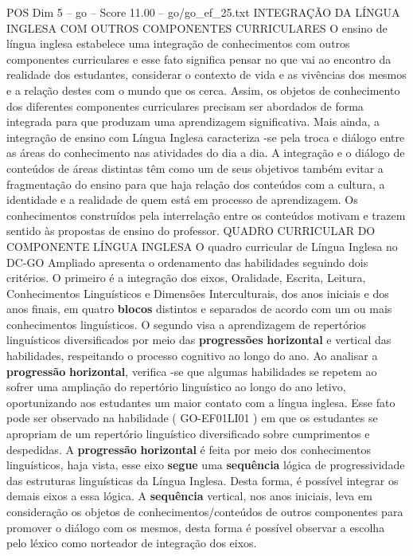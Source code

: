 \begin{textsample}{POS Dim 5 – go – Score 11.00 – go/go\_ef\_25.txt}  \label{ex:f5_pos_003}
INTEGRAÇÃO DA LÍNGUA INGLESA COM OUTROS COMPONENTES CURRICULARES O ensino de língua inglesa estabelece uma integração de conhecimentos com outros componentes curriculares e esse fato significa pensar no que vai ao encontro da realidade dos estudantes, considerar o contexto de vida e as vivências dos mesmos e a relação destes com o mundo que os cerca.
Assim, os objetos de conhecimento dos diferentes componentes curriculares precisam ser abordados de forma integrada para que produzam uma aprendizagem significativa.
Mais ainda, a integração de ensino com Língua Inglesa caracteriza -se pela troca e diálogo entre as áreas do conhecimento nas atividades do dia a dia.
A integração e o diálogo de conteúdos de áreas distintas têm como um de seus objetivos também evitar a fragmentação do ensino para que haja relação dos conteúdos com a cultura, a identidade e a realidade de quem está em processo de aprendizagem.
Os conhecimentos construídos pela interrelação entre os conteúdos motivam e trazem sentido às propostas de ensino do professor.
QUADRO CURRICULAR DO COMPONENTE LÍNGUA INGLESA O quadro curricular de Língua Inglesa no DC-GO Ampliado apresenta o ordenamento das habilidades seguindo dois critérios.
O primeiro é a integração dos eixos, Oralidade, Escrita, Leitura, Conhecimentos Linguísticos e Dimensões Interculturais, dos anos iniciais e dos anos finais, em quatro \textbf{blocos} distintos e separados de acordo com um ou mais conhecimentos linguísticos.
O segundo visa a aprendizagem de repertórios linguísticos diversificados por meio das \textbf{progressões} \textbf{horizontal} e vertical das habilidades, respeitando o processo cognitivo ao longo do ano.
Ao analisar a \textbf{progressão} \textbf{horizontal}, verifica -se que algumas habilidades se repetem ao sofrer uma ampliação do repertório linguístico ao longo do ano letivo, oportunizando aos estudantes um maior contato com a língua inglesa.
Esse fato pode ser observado na habilidade ( GO-EF01LI01 ) em que os estudantes se apropriam de um repertório linguístico diversificado sobre cumprimentos e despedidas.
A \textbf{progressão} \textbf{horizontal} é feita por meio dos conhecimentos linguísticos, haja vista, esse eixo \textbf{segue} uma \textbf{sequência} lógica de progressividade das estruturas linguísticas da Língua Inglesa.
Desta forma, é possível integrar os demais eixos a essa lógica.
A \textbf{sequência} vertical, nos anos iniciais, leva em consideração os objetos de conhecimentos/conteúdos de outros componentes para promover o diálogo com os mesmos, desta forma é possível observar a escolha pelo léxico como norteador de integração dos eixos.

\end{textsample}
